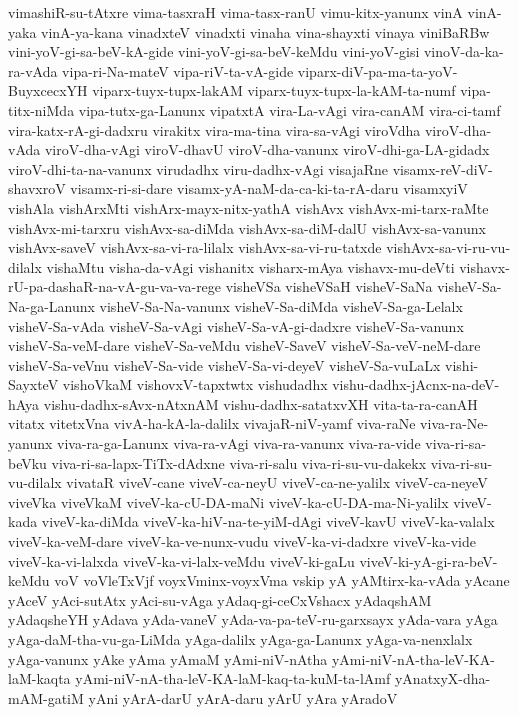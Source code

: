 {vimashiR-su-tAtxre
vima-tasxraH
vima-tasx-ranU
vimu-kitx-yanunx
vinA
vinA-yaka
vinA-ya-kana
vinadxteV
vinadxti
vinaha
vina-shayxti
vinaya
viniBaRBw
vini-yoV-gi-sa-beV-kA-gide
vini-yoV-gi-sa-beV-keMdu
vini-yoV-gisi
vinoV-da-ka-ra-vAda
vipa-ri-Na-mateV
vipa-riV-ta-vA-gide
viparx-diV-pa-ma-ta-yoV-BuyxcecxYH
viparx-tuyx-tupx-lakAM
viparx-tuyx-tupx-la-kAM-ta-numf
vipa-titx-niMda
vipa-tutx-ga-Lanunx
vipatxtA
vira-La-vAgi
vira-canAM
vira-ci-tamf
vira-katx-rA-gi-dadxru
virakitx
vira-ma-tina
vira-sa-vAgi
viroVdha
viroV-dha-vAda
viroV-dha-vAgi
viroV-dhavU
viroV-dha-vanunx
viroV-dhi-ga-LA-gidadx
viroV-dhi-ta-na-vanunx
virudadhx
viru-dadhx-vAgi
visajaRne
visamx-reV-diV-shavxroV
visamx-ri-si-dare
visamx-yA-naM-da-ca-ki-ta-rA-daru
visamxyiV
vishAla
vishArxMti
vishArx-mayx-nitx-yathA
vishAvx
vishAvx-mi-tarx-raMte
vishAvx-mi-tarxru
vishAvx-sa-diMda
vishAvx-sa-diM-dalU
vishAvx-sa-vanunx
vishAvx-saveV
vishAvx-sa-vi-ra-lilalx
vishAvx-sa-vi-ru-tatxde
vishAvx-sa-vi-ru-vu-dilalx
vishaMtu
visha-da-vAgi
vishanitx
visharx-mAya
vishavx-mu-deVti
vishavx-rU-pa-dashaR-na-vA-gu-va-va-rege
visheVSa
visheVSaH
visheV-SaNa
visheV-Sa-Na-ga-Lanunx
visheV-Sa-Na-vanunx
visheV-Sa-diMda
visheV-Sa-ga-Lelalx
visheV-Sa-vAda
visheV-Sa-vAgi
visheV-Sa-vA-gi-dadxre
visheV-Sa-vanunx
visheV-Sa-veM-dare
visheV-Sa-veMdu
visheV-SaveV
visheV-Sa-veV-neM-dare
visheV-Sa-veVnu
visheV-Sa-vide
visheV-Sa-vi-deyeV
visheV-Sa-vuLaLx
vishi-SayxteV
vishoVkaM
vishovxV-tapxtwtx
vishudadhx
vishu-dadhx-jAcnx-na-deV-hAya
vishu-dadhx-sAvx-nAtxnAM
vishu-dadhx-satatxvXH
vita-ta-ra-canAH
vitatx
vitetxVna
vivA-ha-kA-la-dalilx
vivajaR-niV-yamf
viva-raNe
viva-ra-Ne-yanunx
viva-ra-ga-Lanunx
viva-ra-vAgi
viva-ra-vanunx
viva-ra-vide
viva-ri-sa-beVku
viva-ri-sa-lapx-TiTx-dAdxne
viva-ri-salu
viva-ri-su-vu-dakekx
viva-ri-su-vu-dilalx
vivataR
viveV-cane
viveV-ca-neyU
viveV-ca-ne-yalilx
viveV-ca-neyeV
viveVka
viveVkaM
viveV-ka-cU-DA-maNi
viveV-ka-cU-DA-ma-Ni-yalilx
viveV-kada
viveV-ka-diMda
viveV-ka-hiV-na-te-yiM-dAgi
viveV-kavU
viveV-ka-valalx
viveV-ka-veM-dare
viveV-ka-ve-nunx-vudu
viveV-ka-vi-dadxre
viveV-ka-vide
viveV-ka-vi-lalxda
viveV-ka-vi-lalx-veMdu
viveV-ki-gaLu
viveV-ki-yA-gi-ra-beV-keMdu
voV
voVleTxVjf
voyxVminx-voyxVma
vskip
yA
yAMtirx-ka-vAda
yAcane
yAceV
yAci-sutAtx
yAci-su-vAga
yAdaq-gi-ceCxVshacx
yAdaqshAM
yAdaqsheYH
yAdava
yAda-vaneV
yAda-va-pa-teV-ru-garxsayx
yAda-vara
yAga
yAga-daM-tha-vu-ga-LiMda
yAga-dalilx
yAga-ga-Lanunx
yAga-va-nenxlalx
yAga-vanunx
yAke
yAma
yAmaM
yAmi-niV-nAtha
yAmi-niV-nA-tha-leV-KA-laM-kaqta
yAmi-niV-nA-tha-leV-KA-laM-kaq-ta-kuM-ta-lAmf
yAnatxyX-dha-mAM-gatiM
yAni
yArA-darU
yArA-daru
yArU
yAra
yAradoV
}
